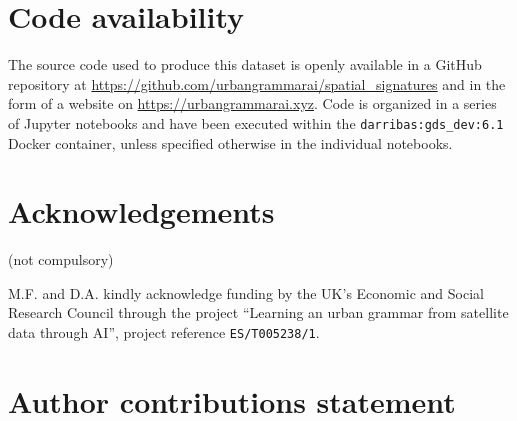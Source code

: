 \documentclass[fleqn,10pt]{wlscirep}
\begin{document}
\section*{Code availability}

The source code used to produce this dataset is openly available in a GitHub repository
at \newline
\hyperlink{https://github.com/urbangrammarai/spatial\_signatures}{https://github.com/urbangrammarai/spatial\_signatures}
and in the form of a website on
\hyperlink{https://urbangrammarai.xyz}{https://urbangrammarai.xyz}.
Code is
organized in a series of Jupyter notebooks and have been executed within the
\texttt{darribas:gds\_dev:6.1}\cite{gds_env}
Docker container, unless specified otherwise in the individual notebooks.




\section*{Acknowledgements} (not compulsory)


M.F. and D.A. kindly acknowledge funding by the UK's Economic and Social Research
Council through the project ``Learning an urban grammar from satellite data
through AI'', project reference \texttt{ES/T005238/1}.

\section*{Author contributions statement}
\end{document}
